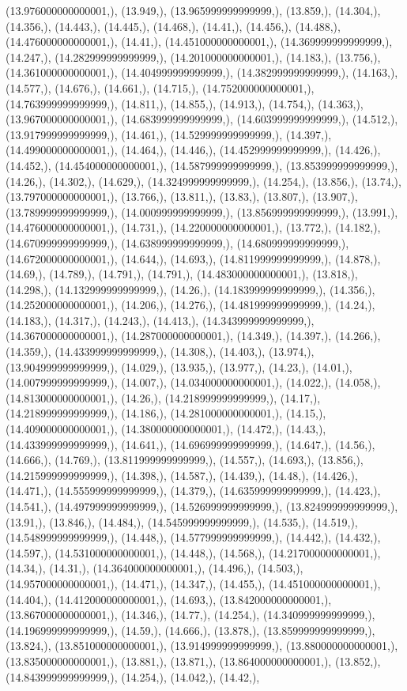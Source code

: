 \documentclass{article}
\begin{document}
(13.976000000000001,), (13.949,), (13.965999999999999,), (13.859,), (14.304,), (14.356,), (14.443,), (14.445,), (14.468,), (14.41,), (14.456,), (14.488,), (14.476000000000001,), (14.41,), (14.451000000000001,), (14.369999999999999,), (14.247,), (14.282999999999999,), (14.201000000000001,), (14.183,), (13.756,), (14.361000000000001,), (14.404999999999999,), (14.382999999999999,), (14.163,), (14.577,), (14.676,), (14.661,), (14.715,), (14.752000000000001,), (14.763999999999999,), (14.811,), (14.855,), (14.913,), (14.754,), (14.363,), (13.967000000000001,), (14.683999999999999,), (14.603999999999999,), (14.512,), (13.917999999999999,), (14.461,), (14.529999999999999,), (14.397,), (14.499000000000001,), (14.464,), (14.446,), (14.452999999999999,), (14.426,), (14.452,), (14.454000000000001,), (14.587999999999999,), (13.853999999999999,), (14.26,), (14.302,), (14.629,), (14.324999999999999,), (14.254,), (13.856,), (13.74,), (13.797000000000001,), (13.766,), (13.811,), (13.83,), (13.807,), (13.907,), (13.789999999999999,), (14.000999999999999,), (13.856999999999999,), (13.991,), (14.476000000000001,), (14.731,), (14.220000000000001,), (13.772,), (14.182,), (14.670999999999999,), (14.638999999999999,), (14.680999999999999,), (14.672000000000001,), (14.644,), (14.693,), (14.811999999999999,), (14.878,), (14.69,), (14.789,), (14.791,), (14.791,), (14.483000000000001,), (13.818,), (14.298,), (14.132999999999999,), (14.26,), (14.183999999999999,), (14.356,), (14.252000000000001,), (14.206,), (14.276,), (14.481999999999999,), (14.24,), (14.183,), (14.317,), (14.243,), (14.413,), (14.343999999999999,), (14.367000000000001,), (14.287000000000001,), (14.349,), (14.397,), (14.266,), (14.359,), (14.433999999999999,), (14.308,), (14.403,), (13.974,), (13.904999999999999,), (14.029,), (13.935,), (13.977,), (14.23,), (14.01,), (14.007999999999999,), (14.007,), (14.034000000000001,), (14.022,), (14.058,), (14.813000000000001,), (14.26,), (14.218999999999999,), (14.17,), (14.218999999999999,), (14.186,), (14.281000000000001,), (14.15,), (14.409000000000001,), (14.380000000000001,), (14.472,), (14.43,), (14.433999999999999,), (14.641,), (14.696999999999999,), (14.647,), (14.56,), (14.666,), (14.769,), (13.811999999999999,), (14.557,), (14.693,), (13.856,), (14.215999999999999,), (14.398,), (14.587,), (14.439,), (14.48,), (14.426,), (14.471,), (14.555999999999999,), (14.379,), (14.635999999999999,), (14.423,), (14.541,), (14.497999999999999,), (14.526999999999999,), (13.824999999999999,), (13.91,), (13.846,), (14.484,), (14.545999999999999,), (14.535,), (14.519,), (14.548999999999999,), (14.448,), (14.577999999999999,), (14.442,), (14.432,), (14.597,), (14.531000000000001,), (14.448,), (14.568,), (14.217000000000001,), (14.34,), (14.31,), (14.364000000000001,), (14.496,), (14.503,), (14.957000000000001,), (14.471,), (14.347,), (14.455,), (14.451000000000001,), (14.404,), (14.412000000000001,), (14.693,), (13.842000000000001,), (13.867000000000001,), (14.346,), (14.77,), (14.254,), (14.340999999999999,), (14.196999999999999,), (14.59,), (14.666,), (13.878,), (13.859999999999999,), (13.824,), (13.851000000000001,), (13.914999999999999,), (13.880000000000001,), (13.835000000000001,), (13.881,), (13.871,), (13.864000000000001,), (13.852,), (14.843999999999999,), (14.254,), (14.042,), (14.42,), 
\end{document}
